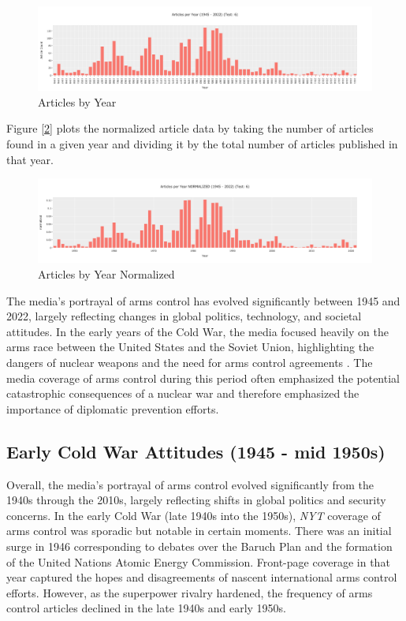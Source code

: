 \documentclass[11,5 pt]{article}
\begin{document}
    \begin{figure}[!htb]
        \centering
        \includegraphics[scale=0.265]{images/Articles_Per_Year.png}
        \caption{Articles by Year}
        \label{fig:Article Data}
    \end{figure}
    
    Figure [\ref{fig:Normalized Article Data}] plots the normalized article data by taking the number of articles found in a given year and dividing it by the total number of articles published in that year. 
    
    \begin{figure}[!htb]
        \centering
        \includegraphics[scale=0.265]{images/Article_Per_Year_Normalized.png}
        \caption{Articles by Year Normalized}
        \label{fig:Normalized Article Data}
    \end{figure}
    
    The media's portrayal of arms control has evolved significantly between 1945 and 2022, largely reflecting changes in global politics, technology, and societal attitudes. In the early years of the Cold War, the media focused heavily on the arms race between the United States and the Soviet Union, highlighting the dangers of nuclear weapons and the need for arms control agreements \cite{Dorman1988}. The media coverage of arms control during this period often emphasized the potential catastrophic consequences of a nuclear war and therefore emphasized the importance of diplomatic prevention efforts. 
    

\subsection*{Early Cold War Attitudes (1945 - mid 1950s)}

    Overall, the media’s portrayal of arms control evolved significantly from the 1940s through the 2010s, largely reflecting shifts in global politics and security concerns. In the early Cold War (late 1940s into the 1950s), \textit{NYT} coverage of arms control was sporadic but notable in certain moments. There was an initial surge in 1946 corresponding to debates over the Baruch Plan and the formation of the United Nations Atomic Energy Commission. Front-page coverage in that year captured the hopes and disagreements of nascent international arms control efforts. However, as the superpower rivalry hardened, the frequency of arms control articles declined in the late 1940s and early 1950s. 
    
\end{document}
